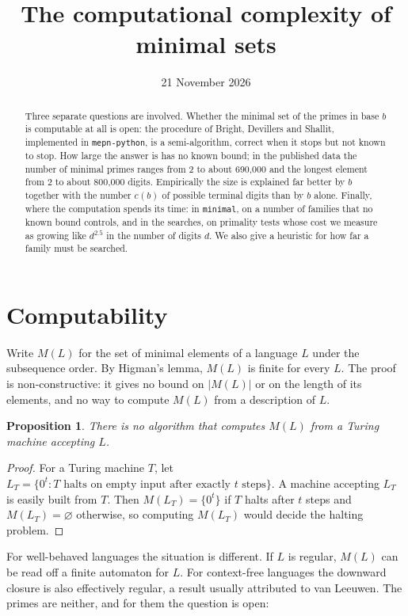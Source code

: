 \documentclass[11pt]{article}
\title{The computational complexity of minimal sets}
\author{}  %
\date{21 November 2026}
\newtheorem{proposition}[theorem]{Proposition}
\theoremstyle{remark}
\newcommand{\code}[1]{\texttt{#1}}
\begin{document}
\maketitle

\begin{abstract}
Three separate questions are involved. Whether the minimal set of the primes in base $b$ is computable at all is open: the procedure of Bright, Devillers and Shallit, implemented in \code{mepn-python}, is a semi-algorithm, correct when it stops but not known to stop. How large the answer is has no known bound; in the published data the number of minimal primes ranges from 2 to about 690{,}000 and the longest element from 2 to about 800{,}000 digits. Empirically the size is explained far better by $b$ together with the number $c(b)$ of possible terminal digits than by $b$ alone. Finally, where the computation spends its time: in \code{minimal}, on a number of families that no known bound controls, and in the searches, on primality tests whose cost we measure as growing like $d^{2.5}$ in the number of digits $d$. We also give a heuristic for how far a family must be searched.
\end{abstract}

\section{Computability}

Write $M(L)$ for the set of minimal elements of a language $L$ under the subsequence order. By Higman's lemma, $M(L)$ is finite for every $L$. The proof is non-constructive: it gives no bound on $|M(L)|$ or on the length of its elements, and no way to compute $M(L)$ from a description of $L$.

\begin{proposition}\label{prop:undecidable}
There is no algorithm that computes $M(L)$ from a Turing machine accepting $L$.
\end{proposition}

\begin{proof}
For a Turing machine $T$, let $L_T=\{0^t : T \text{ halts on empty input after exactly } t \text{ steps}\}$. A machine accepting $L_T$ is easily built from $T$. Then $M(L_T)=\{0^t\}$ if $T$ halts after $t$ steps and $M(L_T)=\varnothing$ otherwise, so computing $M(L_T)$ would decide the halting problem.
\end{proof}

For well-behaved languages the situation is different. If $L$ is regular, $M(L)$ can be read off a finite automaton for $L$. For context-free languages the downward closure is also effectively regular, a result usually attributed to van Leeuwen. The primes are neither, and for them the question is open:
\end{document}

